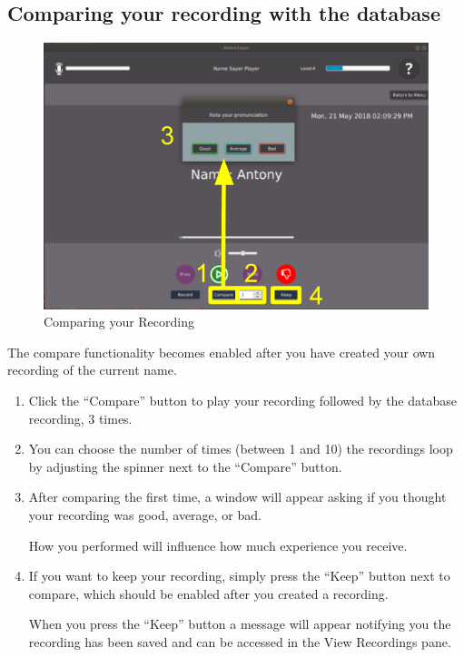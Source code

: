 \documentclass[a4paper,12pt]{article}
\begin{document}
\subsection{Comparing your recording with the database}
\begin{figure}[!h]
	\includegraphics[width=\linewidth]{compare.png}
	\caption{Comparing your Recording}
\end{figure}
The compare functionality becomes enabled after you have created your own recording of the current name.
\begin{enumerate}[label=\textbf{\arabic*}]
	\item Click the “Compare” button to play your recording followed by the database recording, 3 times.
	
	\item You can choose the number of times (between 1 and 10) the recordings loop by adjusting the spinner next to the “Compare” button.
	
	\item After comparing the first time, a window will appear asking if you thought your recording was good, average, or bad. 
	
	How you performed will influence how much experience you receive.
	
	\item If you want to keep your recording, simply press the “Keep” button next to compare, which should be enabled after you created a recording.
	
	When you press the “Keep” button a message will appear notifying you the recording has been saved and can be accessed in the View Recordings pane.
\end{enumerate}
\newpage
\end{document}
